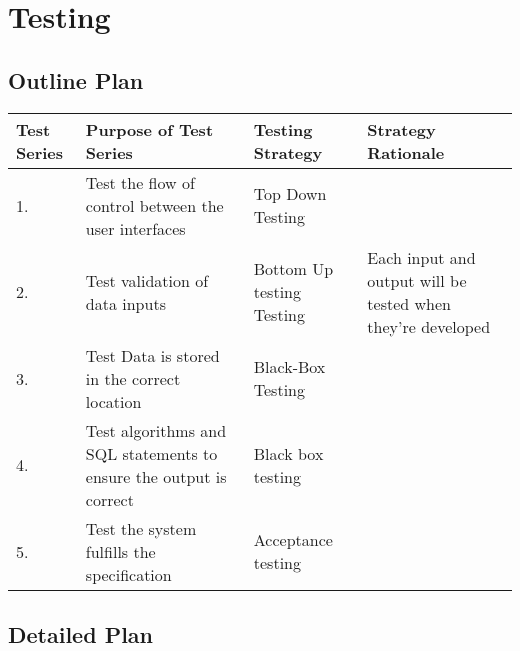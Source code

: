 \section{Testing}
\begin{landscape}

\subsection{Outline Plan}
\begin{center}
    \begin{tabular}{|p{2cm}|p{5cm}|p{5cm}|p{4cm}|}
        \hline
        \textbf{Test Series} & \textbf{Purpose of Test Series} & \textbf{Testing Strategy} & \textbf{Strategy Rationale}\\ \hline
	1. & Test the flow of control between the user interfaces & Top Down Testing &  \\ \hline
	2. & Test validation of data inputs & Bottom Up testing Testing &  Each input and output will be tested when they're developed\\ \hline
	3. & Test Data is stored in the correct location & Black-Box Testing & \\ \hline
	4. & Test algorithms and SQL statements to ensure the output is correct & Black box testing &\\ \hline
	5. & Test the system fulfills the specification & Acceptance testing & \\ \hline

    \end{tabular}
\end{center}

\subsection{Detailed Plan}
\pagebreak


\end{landscape}

